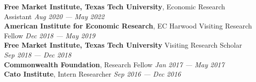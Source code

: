 \documentclass[a4paper,11pt]{article}
\begin{document}
\textbf{Free Market Institute, Texas Tech University}, Economic Research Assistant \hfill \textit{Aug 2020 --- May 2022} \\

\textbf{American Institute for Economic Research}, EC Harwood Visiting Research Fellow \hfill \textit{Dec 2018 --- May 2019}\\

\textbf{Free Market Institute, Texas Tech University} Visiting Research Scholar \hfill  \textit{Sep 2018 --- Dec 2018}\\

\textbf{Commonwealth Foundation}, Research Fellow \hfill \textit{Jan 2017 --- May 2017}\\

\textbf{Cato Institute}, Intern Researcher \hfill \textit{Sep 2016 --- Dec 2016}\\
\vspace{0.5mm}
\end{document}
